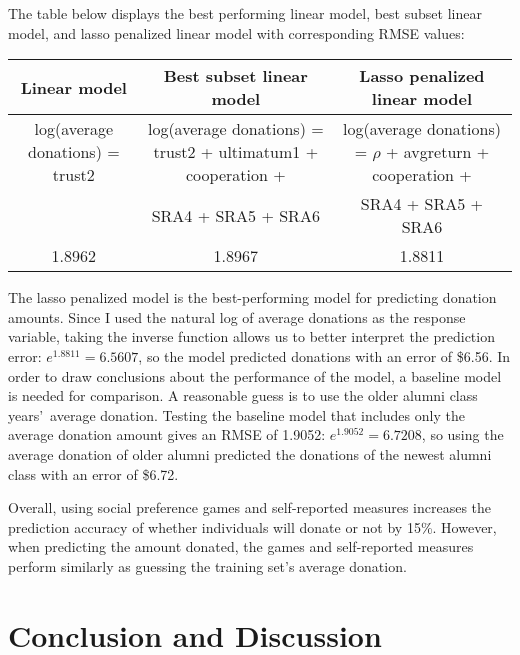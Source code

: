 \documentclass[12pt]{article}
\begin{document}
 
The table below displays the best performing linear model, best subset linear model, and lasso penalized linear model with corresponding RMSE values:
 
\vspace{5mm} \begin{adjustbox}{width=\textwidth}
\begin{tabular}{ c | c | c }
\hline \hline
Linear model & Best subset linear model & Lasso penalized linear model \\
\hline
log(average donations) = trust2 & log(average donations) = trust2 + ultimatum1 + cooperation + & log(average donations) = \(\rho\) + avgreturn + cooperation + \\
\small &  SRA4 + SRA5 + SRA6 & SRA4 + SRA5 + SRA6 \\
\hline
1.8962 & 1.8967 & 1.8811 \\
\hline \hline
\end{tabular}
\end{adjustbox}


\vspace{5mm} The lasso penalized model is the best-performing model for predicting donation amounts. Since I used the natural log of average donations as the response variable, taking the inverse function allows us to better interpret the prediction error: \(e^{1.8811} = 6.5607\), so the model predicted donations with an error of \$6.56. In order to draw conclusions about the performance of the model, a baseline model is needed for comparison. A reasonable guess is to use the older alumni class years\rq \ average donation. Testing the baseline model that includes only the average donation amount gives an RMSE of 1.9052: \(e^{1.9052} = 6.7208\), so using the average donation of older alumni predicted the donations of the newest alumni class with an error of \$6.72. 


Overall, using social preference games and self-reported measures increases the prediction accuracy of whether individuals will donate or not by 15\%. However, when predicting the amount donated, the games and self-reported measures perform similarly as guessing the training set\rq s average donation.


\section{Conclusion and Discussion}
\end{document}
